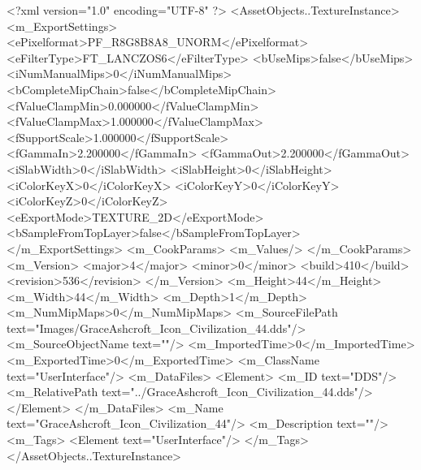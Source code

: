 <?xml version="1.0" encoding="UTF-8" ?>
<AssetObjects..TextureInstance>
	<m_ExportSettings>
		<ePixelformat>PF_R8G8B8A8_UNORM</ePixelformat>
		<eFilterType>FT_LANCZOS6</eFilterType>
		<bUseMips>false</bUseMips>
		<iNumManualMips>0</iNumManualMips>
		<bCompleteMipChain>false</bCompleteMipChain>
		<fValueClampMin>0.000000</fValueClampMin>
		<fValueClampMax>1.000000</fValueClampMax>
		<fSupportScale>1.000000</fSupportScale>
		<fGammaIn>2.200000</fGammaIn>
		<fGammaOut>2.200000</fGammaOut>
		<iSlabWidth>0</iSlabWidth>
		<iSlabHeight>0</iSlabHeight>
		<iColorKeyX>0</iColorKeyX>
		<iColorKeyY>0</iColorKeyY>
		<iColorKeyZ>0</iColorKeyZ>
		<eExportMode>TEXTURE_2D</eExportMode>
		<bSampleFromTopLayer>false</bSampleFromTopLayer>
	</m_ExportSettings>
	<m_CookParams>
		<m_Values/>
	</m_CookParams>
	<m_Version>
		<major>4</major>
		<minor>0</minor>
		<build>410</build>
		<revision>536</revision>
	</m_Version>
	<m_Height>44</m_Height>
	<m_Width>44</m_Width>
	<m_Depth>1</m_Depth>
	<m_NumMipMaps>0</m_NumMipMaps>
	<m_SourceFilePath text="Images/GraceAshcroft_Icon_Civilization_44.dds"/>
	<m_SourceObjectName text=""/>
	<m_ImportedTime>0</m_ImportedTime>
	<m_ExportedTime>0</m_ExportedTime>
	<m_ClassName text="UserInterface"/>
	<m_DataFiles>
		<Element>
			<m_ID text="DDS"/>
			<m_RelativePath text="../GraceAshcroft_Icon_Civilization_44.dds"/>
		</Element>
	</m_DataFiles>
	<m_Name text="GraceAshcroft_Icon_Civilization_44"/>
	<m_Description text=""/>
	<m_Tags>
		<Element text="UserInterface"/>
	</m_Tags>
</AssetObjects..TextureInstance>
